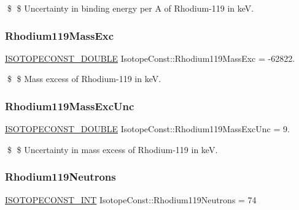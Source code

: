 \$ \$ Uncertainty in binding energy per A of Rhodium-\/119 in keV. \mbox{\label{group___isotope_const-_rhodium-_rh119_ga271a170942c29cffa4c174e9b28ba697}} 
\subsubsection{\texorpdfstring{Rhodium119\+Mass\+Exc}{Rhodium119MassExc}}
{\footnotesize\ttfamily \mbox{\hyperlink{group___isotope_const-_macros_ga8f45a7272ce02c0b4c65c44636ed719a}{I\+S\+O\+T\+O\+P\+E\+C\+O\+N\+S\+T\+\_\+\+D\+O\+U\+B\+LE}} Isotope\+Const\+::\+Rhodium119\+Mass\+Exc = -\/62822.}

\$ \$ Mass excess of Rhodium-\/119 in keV. \mbox{\label{group___isotope_const-_rhodium-_rh119_ga868e61a0fdcb8d17c6565fbe7c920f3d}} 
\subsubsection{\texorpdfstring{Rhodium119\+Mass\+Exc\+Unc}{Rhodium119MassExcUnc}}
{\footnotesize\ttfamily \mbox{\hyperlink{group___isotope_const-_macros_ga8f45a7272ce02c0b4c65c44636ed719a}{I\+S\+O\+T\+O\+P\+E\+C\+O\+N\+S\+T\+\_\+\+D\+O\+U\+B\+LE}} Isotope\+Const\+::\+Rhodium119\+Mass\+Exc\+Unc = 9.}

\$ \$ Uncertainty in mass excess of Rhodium-\/119 in keV. \mbox{\label{group___isotope_const-_rhodium-_rh119_ga0ffad7bee1678389fb45d53ac6e5bce7}} 
\subsubsection{\texorpdfstring{Rhodium119\+Neutrons}{Rhodium119Neutrons}}
{\footnotesize\ttfamily \mbox{\hyperlink{group___isotope_const-_macros_ga5f18360b3e99483a35c32d789e62621c}{I\+S\+O\+T\+O\+P\+E\+C\+O\+N\+S\+T\+\_\+\+I\+NT}} Isotope\+Const\+::\+Rhodium119\+Neutrons = 74}

